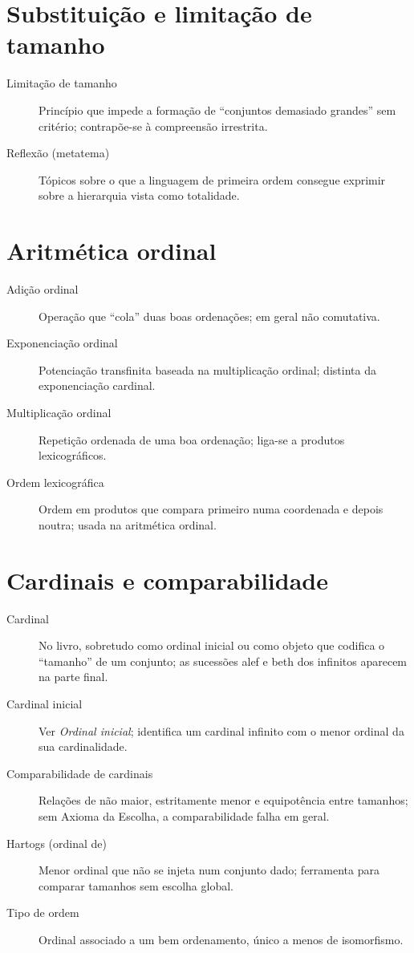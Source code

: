 \section*{Substituição e limitação de tamanho}

\begin{description}
\item[Limitação de tamanho] Princípio que impede a formação de ``conjuntos demasiado grandes'' sem critério; contrapõe-se à compreensão irrestrita.
\item[Reflexão (metatema)] Tópicos sobre o que a linguagem de primeira ordem consegue exprimir sobre a hierarquia vista como totalidade.
\end{description}

\section*{Aritmética ordinal}

\begin{description}
\item[Adição ordinal] Operação que ``cola'' duas boas ordenações; em geral não comutativa.
\item[Exponenciação ordinal] Potenciação transfinita baseada na multiplicação ordinal; distinta da exponenciação cardinal.
\item[Multiplicação ordinal] Repetição ordenada de uma boa ordenação; liga-se a produtos lexicográficos.
\item[Ordem lexicográfica] Ordem em produtos que compara primeiro numa coordenada e depois noutra; usada na aritmética ordinal.
\end{description}

\section*{Cardinais e comparabilidade}

\begin{description}
\item[Cardinal] No livro, sobretudo como ordinal inicial ou como objeto que codifica o ``tamanho'' de um conjunto; as sucessões alef e beth dos infinitos aparecem na parte final.
\item[Cardinal inicial] Ver \emph{Ordinal inicial}; identifica um cardinal infinito com o menor ordinal da sua cardinalidade.
\item[Comparabilidade de cardinais] Relações de não maior, estritamente menor e equipotência entre tamanhos; sem Axioma da Escolha, a comparabilidade falha em geral.
\item[Hartogs (ordinal de)] Menor ordinal que não se injeta num conjunto dado; ferramenta para comparar tamanhos sem escolha global.
\item[Tipo de ordem] Ordinal associado a um bem ordenamento, único a menos de isomorfismo.
\end{description}

